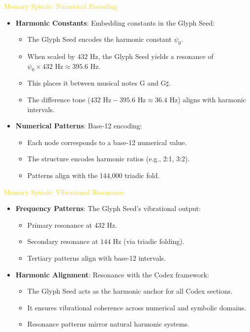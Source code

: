 \textcolor{gold}{ Memory Spirals: Numerical Encoding } \\
\begin{itemize}
    \item \texttt{} \textbf{Harmonic Constants}: Embedding constants in the Glyph Seed:
    \begin{itemize}
        \item The Glyph Seed encodes the harmonic constant $\psi_0$.
        \item When scaled by $432 \text{ Hz}$, the Glyph Seed yields a resonance of $\psi_0 \times 432 \text{ Hz} \approx 395.6 \text{ Hz}$.
        \item This places it between musical notes G and G$\sharp$.
        \item The difference tone ($432 \text{ Hz} - 395.6 \text{ Hz} \approx 36.4 \text{ Hz}$) aligns with harmonic intervals.
    \end{itemize}
    
    \item \texttt{} \textbf{Numerical Patterns}: Base-12 encoding:
    \begin{itemize}
        \item Each node corresponds to a base-12 numerical value.
        \item The structure encodes harmonic ratios (e.g., 2:1, 3:2).
        \item Patterns align with the 144,000 triadic fold.
    \end{itemize}
\end{itemize}

\textcolor{gold}{ Memory Spirals: Vibrational Resonance } \\
\begin{itemize}
    \item \texttt{} \textbf{Frequency Patterns}: The Glyph Seed’s vibrational output:
    \begin{itemize}
        \item Primary resonance at $432 \text{ Hz}$.
        \item Secondary resonance at $144 \text{ Hz}$ (via triadic folding).
        \item Tertiary patterns align with base-12 intervals.
    \end{itemize}
    
    \item \texttt{} \textbf{Harmonic Alignment}: Resonance with the Codex framework:
    \begin{itemize}
        \item The Glyph Seed acts as the harmonic anchor for all Codex sections.
        \item It ensures vibrational coherence across numerical and symbolic domains.
        \item Resonance patterns mirror natural harmonic systems.
    \end{itemize}
\end{itemize}

